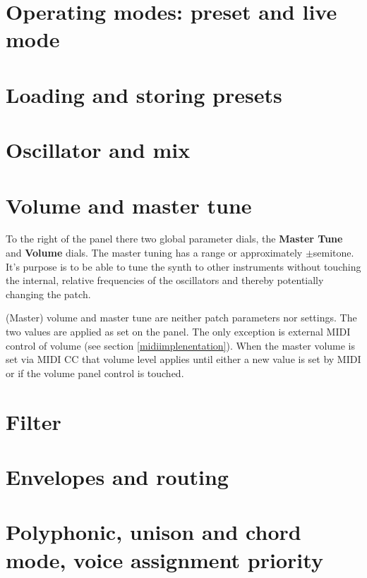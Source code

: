 \documentclass[landscape, 11pt, oneside]{report}
\newenvironment{flowtext}{\addmargin[0cm]{7cm}}{\endaddmargin} %
\begin{document}
\begin{flowtext}
\section{Operating modes: preset and live mode}\label{uimode}



\section{Loading and storing presets}\label{loadstorepatches}



\section{Oscillator and mix}\label{osc}



\section{Volume and master tune}

To the right of the panel there two global parameter dials, the \textbf{Master Tune} and \textbf{Volume} dials. The master tuning has a range or approximately $\pm$semitone. It's purpose is to be able to tune the synth to other instruments without touching the internal, relative frequencies of the oscillators and thereby potentially changing the patch.

(Master) volume and master tune are neither patch parameters nor settings. The two values are applied as set on the panel. The only exception is external MIDI control of volume (see section \ref{midiimplenentation}). When the master volume is set via MIDI CC that volume level applies until either a new value is set by MIDI or if the volume panel control is touched.     

\section{Filter}\label{filter}



\section{Envelopes and routing}\label{envelopes}



\section{Polyphonic, unison and chord mode, voice assignment priority}\label{poly-unison-voice}


\end{flowtext}
\end{document}
